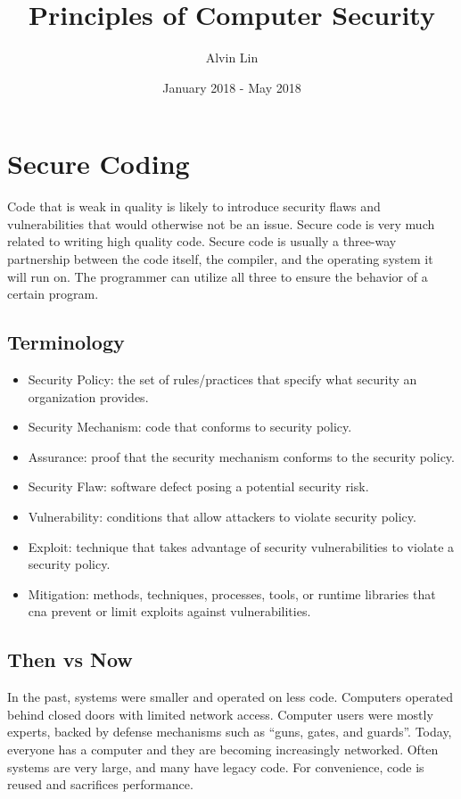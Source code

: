 \documentclass{math}
\title{Principles of Computer Security}
\author{Alvin Lin}
\date{January 2018 - May 2018}
\begin{document}
\maketitle

\section*{Secure Coding}
Code that is weak in quality is likely to introduce security flaws and
vulnerabilities that would otherwise not be an issue. Secure code is very much
related to writing high quality code. Secure code is usually a three-way
partnership between the code itself, the compiler, and the operating system it
will run on. The programmer can utilize all three to ensure the behavior of a
certain program.

\subsection*{Terminology}
\begin{itemize}
  \item Security Policy: the set of rules/practices that specify what security
  an organization provides.
  \item Security Mechanism: code that conforms to security policy.
  \item Assurance: proof that the security mechanism conforms to the security
  policy.
  \item Security Flaw: software defect posing a potential security risk.
  \item Vulnerability: conditions that allow attackers to violate security
  policy.
  \item Exploit: technique that takes advantage of security vulnerabilities to
  violate a security policy.
  \item Mitigation: methods, techniques, processes, tools, or runtime libraries
  that cna prevent or limit exploits against vulnerabilities.
\end{itemize}

\subsection*{Then vs Now}
In the past, systems were smaller and operated on less code. Computers operated
behind closed doors with limited network access. Computer users were mostly
experts, backed by defense mechanisms such as ``guns, gates, and guards''.
Today, everyone has a computer and they are becoming increasingly networked.
Often systems are very large, and many have legacy code. For convenience, code
is reused and sacrifices performance.
\end{document}
